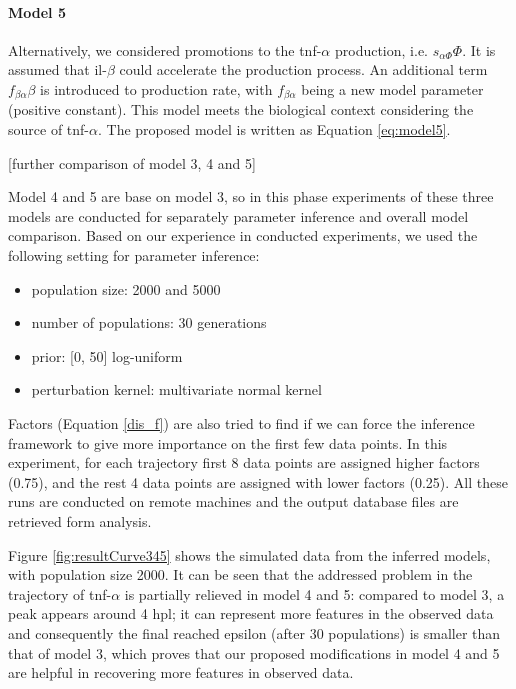 \documentclass[12pt,a4paper]{report}
\begin{document}
\paragraph{Model 5} Alternatively, we considered promotions to the tnf-$\alpha$ production, i.e. $s_{\alpha\Phi}\Phi$. It is assumed that il-$\beta$ could accelerate the production process. An additional term $f_{\beta\alpha}\beta$ is introduced to production rate, with $f_{\beta\alpha}$ being a new model parameter (positive constant). This model meets the biological context considering the source of tnf-$\alpha$. The proposed model is written as Equation \ref{eq:model5}.

[further comparison of model 3, 4 and 5]

Model 4 and 5 are base on model 3, so in this phase experiments of these three models are conducted for separately parameter inference and overall model comparison. Based on our experience in conducted experiments, we used the following setting for parameter inference:

\begin{itemize}
    \item population size: 2000 and 5000
    \item number of populations: 30 generations
    \item prior: [0, 50] log-uniform
    \item perturbation kernel: multivariate normal kernel
\end{itemize}

Factors (Equation \ref{dis_f}) are also tried to find if we can force the inference framework to give more importance on the first few data points. In this experiment, for each trajectory first 8 data points are assigned higher factors (0.75), and the rest 4 data points are assigned with lower factors (0.25). All these runs are conducted on remote machines and the output database files are retrieved form analysis.

Figure \ref{fig:resultCurve345} shows the simulated data from the inferred models, with population size 2000. It can be seen that the addressed problem in the trajectory of tnf-$\alpha$ is partially relieved in model 4 and 5: compared to model 3, a peak appears around 4 hpl; it can represent more features in the observed data and consequently the final reached epsilon (after 30 populations) is smaller than that of model 3, which proves that our proposed modifications in model 4 and 5 are helpful in recovering more features in observed data.
\end{document}

